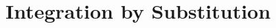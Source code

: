 \section{Integration by Substitution} \label{S:5.3.Substitution}



\newpage



\newpage



\newpage



\newpage

\clearpage
